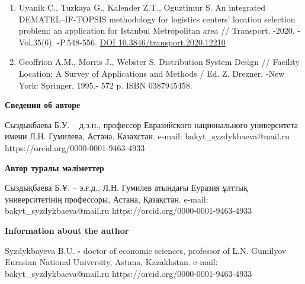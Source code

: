 \begin{enumerate}
{  products with uncertain demands} //
  \href{https://www.sciencedirect.com/journal/expert-systems-with-applications}{Expert
  Systems with Applications}. -2022. -Vol.209(2):118180.
  \href{https://doi.org/10.1016/j.eswa.2022.118180}{DOI
  10.1016/j.eswa.2022.118180}
\item
  Uyanik C., Tuzkaya G., Kalender Z.T., Oguztimur S. An integrated
  DEMATEL--IF-TOPSIS methodology for logistics centers' location
  selection problem: an application for Istanbul Metropolitan area //
  Transport. -2020. -Vol.35(6). -P.548-556.
  \href{https://doi.org/10.3846/transport.2020.12210}{DOI
  10.3846/transport.2020.12210}
\item
  Geoffrion A.M., Morris J., Webster S. Distribution System Design //
  Facility Location: A Survey of Applications and Methods / Ed. Z.
  Drezner. -New York: Springer, 1995.- 572 p. ISBN 0387945458.
\end{enumerate}

{\bfseries Сведения об авторе}

Сыздыкбаева Б.У. -- д.э.н., профессор Евразийского национального
университета имени Л.Н. Гумилева, Астана, Казахстан. e-mail:
bakyt\_syzdykbaeva@mail.ru https://orcid.org/0000-0001-9463-4933

{\bfseries Автор туралы мәліметтер}

Сыздықбаева Б.Ұ. -- э.ғ.д., Л.Н. Гумилев атындағы Еуразия ұлттық
университетінің профессоры, Астана, Қазақстан. e-mail:
bakyt\_syzdykbaeva@mail.ru https://orcid.org/0000-0001-9463-4933

{\bfseries Information about the author}

Syzdykbayeva B.U. {\bfseries -} doctor of economic sciences, professor of
L.N. Gumilyov Eurasian National University, Astana, Kazakhstan. e-mail:
bakyt\_syzdykbaeva@mail.ru https://orcid.org/0000-0001-9463-4933
